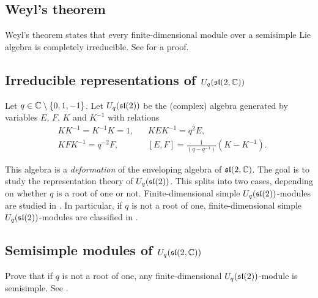\subsection*{Weyl's theorem}

Weyl's theorem states that every finite-dimensional module over
a semisimple Lie algebra is completely irreducible. 
See \cite[Theorem 17.4]{MR2218355} for a proof. 

\subsection*{Irreducible representations of $U_q(\sl(2,\C))$}

Let $q\in\C\setminus\{0,1,-1\}$. 
Let $U_q(\sl(2))$ be the (complex) algebra generated by 
variables $E$, $F$, $K$ and $K^{-1}$ with relations
\begin{align*}
    &KK^{-1}=K^{-1}K=1,
    &&
    KEK^{-1}=q^2E,\\
    &
    KFK^{-1}=q^{-2}F,
    &&
    [E,F]=\frac{1}{(q-q^{-1})}(K-K^{-1}).
\end{align*}

This algebra is a \emph{deformation} of the enveloping algebra
of $\sl(2,\C)$. The goal is to study the 
representation theory of $U_q(\sl(2))$. This splits into
two cases, depending on whether $q$ is a root of one or not. 
Finite-dimensional simple $U_q(\sl(2))$-modules are studied 
in \cite[VI]{MR1321145}. In particular, if 
$q$ is not a root of one, finite-dimensional simple $U_q(\sl(2))$-modules
are classified in \cite[Theorem VI.3.5]{MR1321145}. 

\subsection*{Semisimple modules of $U_q(\sl(2,\C))$}

Prove that if $q$ is not a root of one, any finite-dimensional
$U_q(\sl(2))$-module is semisimple. 
See \cite[Theorem VII.2.2]{MR1321145}. 